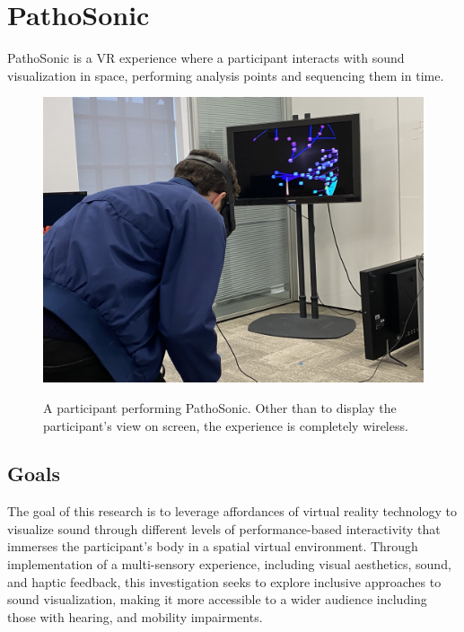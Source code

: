 \documentclass{nime-alternate}
\begin{document}
\section{PathoSonic}

PathoSonic is a VR experience where a participant interacts with sound visualization in space, performing analysis points and sequencing them in time.

\begin{figure}[htbp]
       \centering
              \includegraphics[width=1\textwidth]{IMG_4563.jpg}
       \label{A participant performing PathoSonic. Other than to display the participant's view on screen, the experience is completely wireless.}
       \caption{A participant performing PathoSonic. Other than to display the participant's view on screen, the experience is completely wireless.}
\end{figure}

\subsection{Goals}
The goal of this research is to leverage affordances of virtual reality technology to visualize sound through different levels of performance-based interactivity that immerses the participant's body in a spatial virtual environment. Through implementation of a multi-sensory experience, including visual aesthetics, sound, and haptic feedback, this investigation seeks to explore inclusive approaches to sound visualization, making it more accessible to a wider audience including those with hearing, and mobility impairments.
\end{document}

